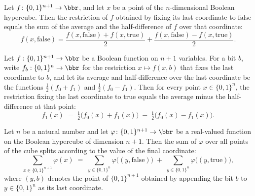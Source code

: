 \begin{lemma}
\leanok
{}
\label{BooleanAnalysis.Hypercontractivity.restrictLast_false_eq}
Let $f\colon\{0,1\}^{n+1}\to\bbr$, and let $x$ be a point of the
$n$-dimensional Boolean hypercube. Then the restriction of $f$ obtained by fixing its
last coordinate to $\mathrm{false}$ equals the sum of the average and the
half-difference of $f$ over that coordinate:
\[
f(x,\mathrm{false}) = \frac{f(x,\mathrm{false}) + f(x,\mathrm{true})}{2} +
\frac{f(x,\mathrm{false}) - f(x,\mathrm{true})}{2}.
\]
\end{lemma}

\begin{lemma}
\leanok
{}
\label{BooleanAnalysis.Hypercontractivity.restrictLast_true_eq}
Let $f : \{0,1\}^{n+1} \to \bbr$ be a Boolean function on $n+1$ variables. For a bit
$b$, write $f_b : \{0,1\}^n \to \bbr$ for the restriction $x \mapsto f(x,b)$ that fixes
the last coordinate to $b$, and let its average and half-difference over the last
coordinate be the functions $\tfrac12(f_0 + f_1)$ and $\tfrac12(f_0 - f_1)$. Then for
every point $x \in \{0,1\}^n$, the restriction fixing the last coordinate to
$\mathrm{true}$ equals the average minus the half-difference at that point:
\[
f_1(x) \;=\; \tfrac12\bigl(f_0(x) + f_1(x)\bigr) \;-\; \tfrac12\bigl(f_0(x) -
f_1(x)\bigr).
\]
\end{lemma}

\begin{lemma}
\leanok
{}
\label{BooleanAnalysis.Hypercontractivity.sum_boolCube_succ}
Let $n$ be a natural number and let $\varphi \colon \{0,1\}^{n+1} \to \bbr$ be a
real-valued function on the Boolean hypercube of dimension $n+1$. Then the sum of
$\varphi$ over all points of the cube splits according to the value of the final
coordinate:
\[
\sum_{x \in \{0,1\}^{n+1}} \varphi(x) \;=\; \sum_{y \in \{0,1\}^{n}}
\varphi\bigl((y,\mathrm{false})\bigr) \;+\; \sum_{y \in \{0,1\}^{n}}
\varphi\bigl((y,\mathrm{true})\bigr),
\]
where $(y,b)$ denotes the point of $\{0,1\}^{n+1}$ obtained by appending the bit $b$ to
$y \in \{0,1\}^{n}$ as its last coordinate.
\end{lemma}

